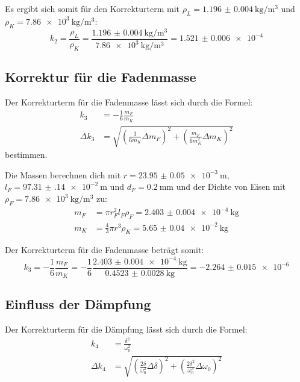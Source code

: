 \documentclass[12pt,a4paper,titlepage]{scrartcl}
\numberwithin{equation}{section}
\numberwithin{table}{section}
\numberwithin{figure}{section}
\begin{document}
Es ergibt sich somit für den Korrekturterm mit $\rho_L = \qty{1.196(4)}{\kilo\gram\per\meter\cubed}$ und $\rho_K = \qty{7.86e3}{\kilo\gram\per\meter\cubed}$:
\begin{equation}
    k_2 = \frac{\rho_L}{\rho_K} = \frac{\qty{1.196(4)}{\kilo\gram\per\meter\cubed}}{\qty{7.86e3}{\kilo\gram\per\meter\cubed}} = \num{1.521(6)e-4}
\end{equation}

\subsection{Korrektur für die Fadenmasse}

Der Korrekturterm für die Fadenmasse lässt sich durch die Formel:
\begin{align}
    k_3 &= -\frac{1}{6}\frac{m_F}{m_K}\\
    \Delta k_3 &= \sqrt{\left(\frac{1}{6 m_K}\Delta m_F\right)^2 + \left(\frac{m_F}{6 m_K^2}\Delta m_K\right)^2}
\end{align}
bestimmen.

Die Massen berechnen dich mit $r = \qty{23.95(5)e-3}{\meter}$, $l_F= \qty{97.31(14)e-2}{\meter}$ und $d_F = \qty{0.2}{\milli\meter}$ und der Dichte von Eisen mit $\rho_F = \qty{7.86e3}{\kilo\gram\per\meter\cubed}$ zu:
\begin{align}
    m_F &= \pi r_F^2 l_F \rho_F = \qty{2.403(4)e-4}{\kilo\gram}\\
    m_K &= \frac{4}{3}\pi r^3 \rho_K = \qty{5.65(4)e-2}{\kilo\gram}
\end{align}

Der Korrekturterm für die Fadenmasse beträgt somit:
\begin{equation}
    k_3 = -\frac{1}{6}\frac{m_F}{m_K} = -\frac{1}{6}\frac{\qty{2.403(4)e-4}{\kilo\gram}}{\qty{0.4523(28)}{\kilo\gram}} = \num{-2.264(15)e-6}
\end{equation}

\subsection{Einfluss der Dämpfung}

Der Korrekturterm für die Dämpfung lässt sich durch die Formel:
\begin{align}
    k_4 &= \frac{\delta^2}{\omega_0^2}\\
    \Delta k_4 &= \sqrt{\left(\frac{2\delta}{\omega_0^2}\Delta \delta\right)^2 + \left(\frac{2\delta^2}{\omega_0^3}\Delta \omega_0\right)^2}
\end{align}
\end{document}
